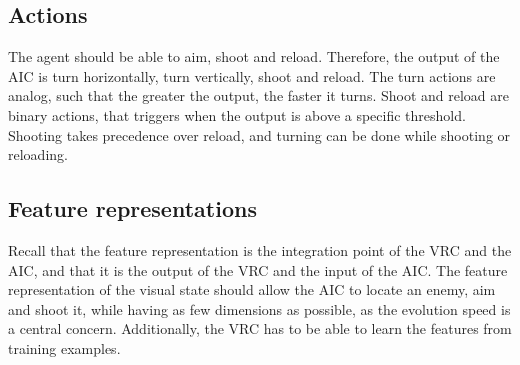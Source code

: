 \subsection{Actions}
The agent should be able to aim, shoot and reload. Therefore, the output of the AIC is turn horizontally, turn vertically, shoot and reload. The turn actions are analog, such that the greater the output, the faster it turns. Shoot and reload are binary actions, that triggers when the output is above a specific threshold. Shooting takes precedence over reload, and turning can be done while shooting or reloading.

\subsection{Feature representations}
Recall that the feature representation is the integration point of the VRC and the AIC, and that it is the output of the VRC and the input of the AIC.
The feature representation of the visual state should allow the AIC to locate an enemy, aim and shoot it, while having as few dimensions as possible, as the evolution speed is a central concern. Additionally, the VRC has to be able to learn the features from training examples.

